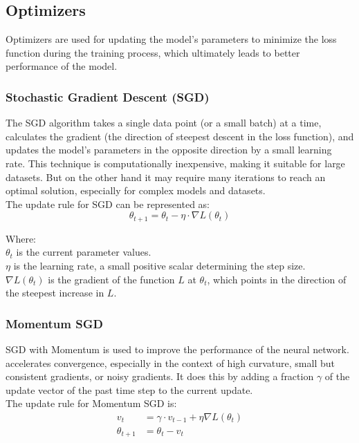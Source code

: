 \documentclass{article}
\begin{document}
\subsection{Optimizers}
Optimizers are used for updating the model's parameters to minimize the loss function during the training process, which ultimately leads to better performance of the model.

\subsubsection{Stochastic Gradient Descent (SGD)}
The SGD algorithm takes a single data point (or a small batch) at a time, calculates the gradient (the direction of steepest descent in the loss function), and updates the model's parameters in the opposite direction by a small learning rate. This technique is computationally inexpensive, making it suitable for large datasets. But on the other hand it may require many iterations to reach an optimal solution, especially for complex models and datasets.\\
The update rule for SGD can be represented as:
$${\theta_{t+1} = \theta_t - \eta \cdot \nabla L(\theta_t)}$$

\noindent\hspace*{10mm}
\begin{minipage}{\dimexpr\linewidth-20mm}
    Where:\\
    ${\theta_t}$ is the current parameter values.\\
    ${\eta}$ is the learning rate, a small positive scalar determining the step size.\\
    ${\nabla L(\theta_t)}$ is the gradient of the function ${L}$ at ${\theta_t}$, which points in the direction of the steepest increase in ${L}$.
\end{minipage}

\subsubsection{Momentum SGD}
SGD with Momentum is used to improve the performance of the neural network. accelerates convergence, especially in the context of high curvature, small but consistent gradients, or noisy gradients. It does this by adding a fraction ${\gamma}$ of the update vector of the past time step to the current update.\\
The update rule for Momentum SGD is:
\begin{align*}
    v_{t}        & = \gamma \cdot v_{t-1} + \eta \nabla L(\theta_t) \\
    \theta_{t+1} & = \theta_t - v_{t}
\end{align*}
\end{document}
